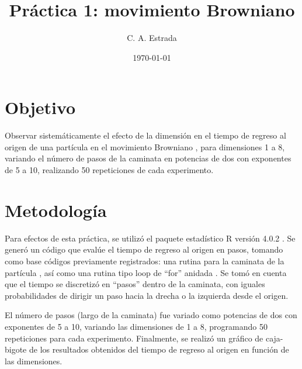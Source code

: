 \documentclass{article}
\title{\bf Práctica 1: movimiento Browniano}
\date{\today}
\author{C. A. Estrada}
\begin{document}
\maketitle

\section{Objetivo}
Observar sistemáticamente el efecto de la dimensión en el tiempo de regreso al origen de una partícula en el movimiento Browniano \cite{dra}, para dimensiones 1 a 8, variando el número de pasos de la caminata en potencias de dos con exponentes de 5 a 10, realizando 50 repeticiones de cada experimento.

\section{Metodología}
Para efectos de esta práctica, se utilizó el paquete estadístico R versión 4.0.2 \cite{R}. Se generó un código que evalúe el tiempo de regreso al origen en pasos, tomando como base códigos previamente registrados: una rutina para la caminata de la partícula \cite{dra}, así como una rutina tipo loop de ``for'' anidada \cite{codigo}. Se tomó en cuenta que el tiempo se discretizó en ``pasos'' dentro de la caminata, con iguales probabilidades de dirigir un paso hacia la drecha o la izquierda desde el origen.

El número de pasos (largo de la caminata) fue variado como potencias de dos con exponentes de 5 a 10, variando las dimensiones de 1 a 8, programando 50 repeticiones para cada experimento. Finalmente, se realizó un gráfico de caja-bigote de los resultados obtenidos del tiempo de regreso al origen en función de las dimensiones.  
\end{document}
